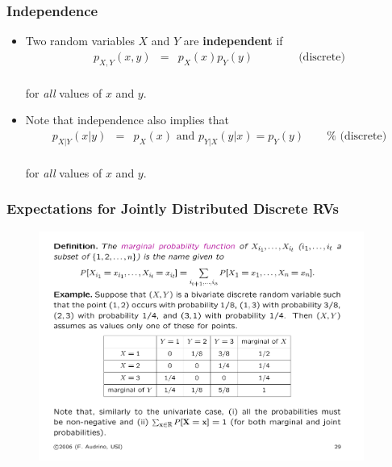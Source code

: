 \documentclass[notes=show,handout]{beamer}\usepackage[]{graphicx}\usepackage[]{color}
\newenvironment{stepitemize}{\begin{itemize}[<+->]}{\end{itemize} }
\begin{document}
\begin{frame}%

\frametitle{Independence }

\begin{stepitemize}
\item Two random variables $X$ and $Y$ are \textbf{independent} if
\begin{eqnarray*}
p_{X,Y}(x,y) &=&p_{X}(x)p_{Y}(y)\qquad \qquad \text{(discrete)} \\
\end{eqnarray*}

 for \emph{all} values of $x$ and $y.$

\item Note that independence also implies that
\begin{eqnarray*}
p_{X|Y}(x|y) &=&p_{X}(x)\text{ and }p_{Y|X}(y|x)=p_{Y}(y)\qquad \text{%
(discrete)} \\
\end{eqnarray*}

for \emph{all} values of $x$ and $y.$
\end{stepitemize}

\end{frame}


\begin{frame}
\frametitle{Expectations for Jointly Distributed Discrete RVs}
\begin{example}
\begin{figure}[ptb]\centering
\includegraphics[width=0.95\textwidth,height=0.75\textheight]{img/ex_audrins.pdf}
\end{figure}
\end{example}
\end{frame}
\end{document}
